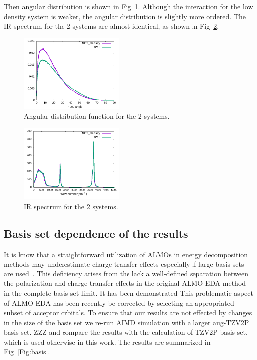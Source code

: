 \documentclass[prl,twocolumn,showpacs]{revtex4}
\begin{document}
Then angular distribution is shown in Fig~\ref{Fig:adfcp}. Although the interaction for the low density system is weaker, the angular distribution is slightly more ordered. The IR spectrum for the 2 systems are almost identical, as shown in Fig~\ref{Fig:ir_cp}.

\begin{figure}
\includegraphics[width=0.45\textwidth]{angular_NVT_NPTCP}
\caption{Angular distribution function for the 2 systems.}\label{Fig:adfcp}
\end{figure} 

\begin{figure}
\includegraphics[width=0.45\textwidth]{ir_NVT_NPTCP}
\caption{IR spectrum for the 2 systems.}\label{Fig:ir_cp}
\end{figure} 

\subsection{Basis set dependence of the results}

It is know that a straightforward utilization of ALMOs in energy decomposition methods may underestimate charge-transfer effects especially if large basis sets are used~\cite{horn2015polarization,herbert2016}. This deficiency arises from the lack a well-defined separation between the polarization and charge transfer effects in the original ALMO EDA method~\cite{EDA} in the complete basis set limit. It has been demonstrated This problematic aspect of ALMO EDA has been recently be corrected by selecting an appropriated subset of acceptor orbitals\cite{horn2015polarization}. To ensure that our results are not effected by changes in the size of the basis set we re-run AIMD simulation with a larger aug-TZV2P basis set. ZZZ and compare the results with the calculation of TZV2P basis set, which is used otherwise in this work. The results are summarized in Fig~\ref{Fig:basis}.
\end{document}
